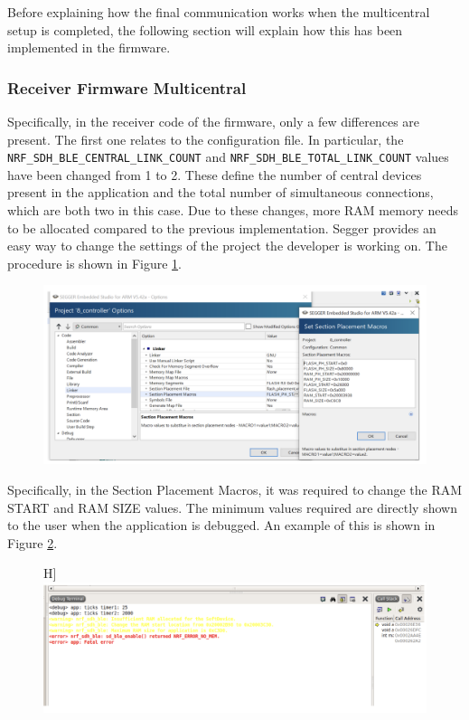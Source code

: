 \documentclass{Configuration_Files/PoliMi3i_thesis}
\begin{document}
Before explaining how the final communication works when the multicentral setup is completed, the following section will explain how this has been implemented in the firmware.

\subsubsection{Receiver Firmware Multicentral}
Specifically, in the receiver code of the firmware, only a few differences are present. The first one relates to the configuration file. In particular, the \texttt{NRF\_SDH\_BLE\_CENTRAL\_LINK\_COUNT} and \texttt{NRF\_SDH\_BLE\_TOTAL\_LINK\_COUNT} values have been changed from 1 to 2. These define the number of central devices present in the application and the total number of simultaneous connections, which are both two in this case. Due to these changes, more RAM memory needs to be allocated compared to the previous implementation. Segger provides an easy way to change the settings of the project the developer is working on. The procedure is shown in Figure \ref{fig:memory_allocation_seggar}.

\begin{figure}[H]
    \centering
    \includegraphics[scale=0.3]{Multicentral/3.png}
    \label{fig:memory_allocation_seggar}
\end{figure}

Specifically, in the Section Placement Macros, it was required to change the RAM START and RAM SIZE values. The minimum values required are directly shown to the user when the application is debugged. An example of this is shown in Figure \ref{fig:memory_allocation_error}.

\begin{figure}H]
    \centering
    \includegraphics[scale=0.3]{Multicentral/4.png}
    \label{fig:memory_allocation_error}
\end{figure}
\end{document}
